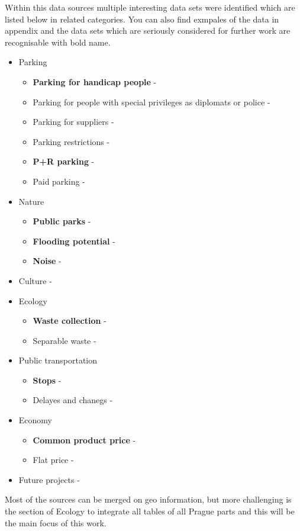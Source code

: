 \documentclass{article}
\begin{document}
Within this data sources multiple interesting data sets were identified which are listed below in related categories. You can also find exmpales of the data in appendix and the data sets which are seriously considered for further work are recognisable with bold name.

\begin{itemize}
    \item Parking
    \begin{itemize}
        \item \textbf{Parking for handicap people} - \cite{Vyhrazen70:online,Vyhrazen35:online}
        \item Parking for people with special privileges as diplomats or police -  \cite{Vyhrazen81:online}
        \item Parking for suppliers - \cite{Vyhrazen63:online} 
        \item Parking restrictions - \cite{zakazy:online}
        \item \textbf{P+R parking} - \cite{wwwtskpr83:online,Zachytna0:online}
        \item Paid parking - \cite{usekypar48:online,Zonyplac33:online}
    \end{itemize}
    \item Nature
        \begin{itemize}
            \item \textbf{Public parks} - \cite{parky:online}
            \item \textbf{Flooding potential} - \cite{zaplavy:online}
            \item \textbf{Noise} - \cite{hluk1:online,hluk2:online}
        \end{itemize}
    \item Culture - \cite{kudyznudy:online,informujpraha:online}
    \item Ecology
        \begin{itemize}
            \item \textbf{Waste collection} - \cite{Velkoobj59:online,Harmonog59:online,McPraha279:online,Velkoobj47:online}
            \item Separable waste - \cite{Stanovis12:online,Stanovis75:online}
        \end{itemize}
    \item Public transportation
        \begin{itemize}
            \item \textbf{Stops} - \cite{Vstupydo88:online}
            \item Delayes and chanegs - \cite{DPPczZme13:online,DPPczMim53:online}
        \end{itemize}
    \item Economy
        \begin{itemize}
            \item \textbf{Common product price} - \cite{Katalogp90:online}
            \item Flat price - \cite{Sreality94:online,}
        \end{itemize}
    \item Future projects -\cite{tenderarena:online}
\end{itemize}

Most of the sources can be merged on geo information, but more challenging is the section of Ecology to integrate all tables of all Prague parts and this will be the main focus of this work.


\printbibliography
\end{document}
